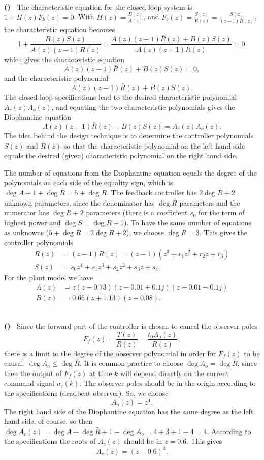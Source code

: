 \documentclass[letterpaper,12pt]{scrartcl}
\newenvironment{exercise}[1][Problem]{\begin{trivlist} \item[\hskip
    \labelsep {\stepcounter{exerctr}\bfseries #1
      \arabic{exerctr}}]}{\end{trivlist}\vspace{10mm}}
\newcounter{exerctr}
\newcounter{abcctr}[exerctr]
\newcommand{\abc}{\noindent\vspace{1mm}\\ {\bf
    \stepcounter{abcctr}(\alph{abcctr})\ }}
\begin{document}
\begin{exercise}
\abc 
The characteristic equation for the closed-loop system is $1+H(z)F_b(z)=0$. With $H(z)= \frac{B(z)}{A(z)}$, and $F_b(z) = \frac{S(z)}{R(z)} = \frac{S(z)}{(z-1)\bar{R}(z)}$, the characteristic equation becomes 
\[ 1 + \frac{B(z)S(z)}{A(z)(z-1)\bar{R(z)}} = \frac{A(z)(z-1)\bar{R}(z) + B(z)S(z)}{A(z)(z-1)\bar{R}(z)} = 0\,\]
which gives the characteristic equation
\[ A(z)(z-1)\bar{R}(z) + B(z)S(z) = 0,\]
and the characteristic polynomial 
\[ A(z)(z-1)\bar{R}(z) + B(z)S(z).\]
The closed-loop specifications lead to the desired characteristic polynomial 
\(A_c(z)A_o(z)\), and equating the two characteristic polynomials gives the Diophantine equation
\[ A(z)(z-1)\bar{R}(z) + B(z)S(z) = A_c(z)A_o(z).\]
The idea behind the design technique is to determine the controller polynomials $S(z)$ and $\bar{R}(z)$ so that the characteristic polynomial on the left hand side equals the desired (given) characteristic polynomial on the right hand side. 
 
The number of equations from the Diophantine equation equals the degree of the polynomials on each side of the equality sign, which is $\deg A + 1+\deg \bar{R}= 5+\deg\bar{R}$. The feedback controller has $2\deg\bar{R}+2$ unknown parameters, since the denominator has $\deg\bar{R}$ parameters and the numerator has $\deg\bar{R} + 2$ parameters (there is a coefficient $s_0$ for the term of highest power and $\deg S = \deg\bar{R} + 1$). To have the same number of equations as unknowns ($5+\deg\bar{R} = 2\deg\bar{R}+2$), we choose $\deg\bar{R}=3$. This gives the controller polynomials
\begin{align*}
  R(z) &= (z-1)\bar{R}(z) = (z-1)(z^3 + r_1z^2 + r_2z + r_3)\\
  S(z) &= s_0z^4 + s_1z^3 + s_2z^2 + s_3z + s_4.
\end{align*}
For the plant model we have
\begin{align*}
  A(z) &= z(z-0.73)(z-0.01 + 0.1j)(z-0.01 - 0.1j)\\
  B(z) &= 0.66(z+1.13)(z+0.08).
\end{align*}

\abc
Since the forward part of the controller is chosen to cancel the observer poles 
$$F_f(z) = \frac{T(z)}{R(z)} = \frac{t_0A_o(z)}{R(z)},$$ there is a limit to the degree of the observer polynomial in order for $F_f(z)$ to be causal: $\deg A_o \le \deg R$. It is common practice to choose $\deg A_o = \deg R$, since then the output of $F_f(z)$ at time $k$ will depend directly on the current command signal $u_c(k)$. The observer poles should be in the origin according to the specifications (deadbeat observer). So, we choose 
\[ A_o(z) = z^4.\]
The right hand side of the Diophantine equation has the same degree as the left hand side, of course, so then $\deg A_c(z) = \deg A + \deg \bar{R} + 1 - \deg A_o = 4 + 3 + 1 - 4 = 4$. According to the specifications the roots of $A_c(z)$ should be in $z=0.6$. This gives
\[ A_c(z) = (z-0.6)^4.\]

\end{exercise}
\end{document}
